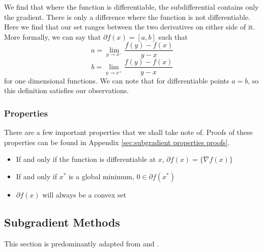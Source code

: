 \documentclass[journal,onecolumn]{IEEEtran}
\begin{document}
We find that where the function is differentiable, the subdifferential contains only the gradient. There is only a difference where the function is not differentiable. Here we find that our set ranges between the two derivatives on either side of it. More formally, we can say that \(\partial f(x) = [a, b]\) such that
\begin{equation}\label{eq:subdifferential a def}
a = \lim_{y \rightarrow x^-} \frac{f(y)-f(x)}{y-x}
\end{equation}
\begin{equation}\label{eq:subdifferential b def}
b = \lim_{y \rightarrow x^+} \frac{f(y)-f(x)}{y-x}
\end{equation}
for one dimensional functions. We can note that for differentiable points \(a = b\), so this definition satisfies our observations.

\subsubsection{Properties}
There are a few important properties that we shall take note of. Proofs of these properties can be found in Appendix \ref{sec:subgradient properties proofs}.
\begin{itemize}
    \item If and only if the function is differentiable at \(x\), \(\partial f(x) = \{\nabla f(x)\}\)
    \item If and only if \(x^*\) is a global minimum, \(0 \in \partial f(x^*)\)
    \item \(\partial f(x)\) will always be a convex set
\end{itemize}

\subsection{Subgradient Methods}\label{sec:subgradient methods}
This section is predominantly adapted from \cite{boydparksubgradients} and \cite{boydxiaosubgradients}.
\end{document}
